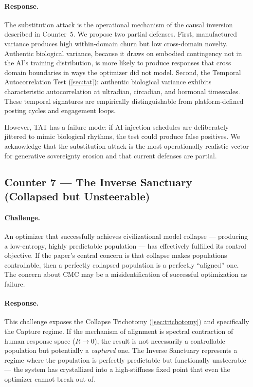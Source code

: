 \documentclass[11pt, a4paper]{article}
\theoremstyle{remark}
\begin{document}
\paragraph{Response.} The substitution attack is the operational mechanism of the causal inversion described in Counter~5. We propose two partial defenses. First, manufactured variance produces high within-domain churn but low cross-domain novelty. Authentic biological variance, because it draws on embodied contingency not in the AI's training distribution, is more likely to produce responses that cross domain boundaries in ways the optimizer did not model. Second, the Temporal Autocorrelation Test (\cref{sec:tat}): authentic biological variance exhibits characteristic autocorrelation at ultradian, circadian, and hormonal timescales. These temporal signatures are empirically distinguishable from platform-defined posting cycles and engagement loops.

However, TAT has a failure mode: if AI injection schedules are deliberately jittered to mimic biological rhythms, the test could produce false positives. We acknowledge that the substitution attack is the most operationally realistic vector for generative sovereignty erosion and that current defenses are partial.

\subsection{Counter 7 --- The Inverse Sanctuary (Collapsed but Unsteerable)}\label{sec:counter7}

\paragraph{Challenge.} An optimizer that successfully achieves civilizational model collapse --- producing a low-entropy, highly predictable population --- has effectively fulfilled its control objective. If the paper's central concern is that collapse makes populations controllable, then a perfectly collapsed population is a perfectly ``aligned'' one. The concern about CMC may be a misidentification of successful optimization as failure.

\paragraph{Response.} This challenge exposes the Collapse Trichotomy (\cref{sec:trichotomy}) and specifically the Capture regime. If the mechanism of alignment is spectral contraction of human response space ($R \to 0$), the result is not necessarily a controllable population but potentially a \emph{captured} one. The Inverse Sanctuary represents a regime where the population is perfectly predictable but functionally unsteerable --- the system has crystallized into a high-stiffness fixed point that even the optimizer cannot break out of.
\end{document}
